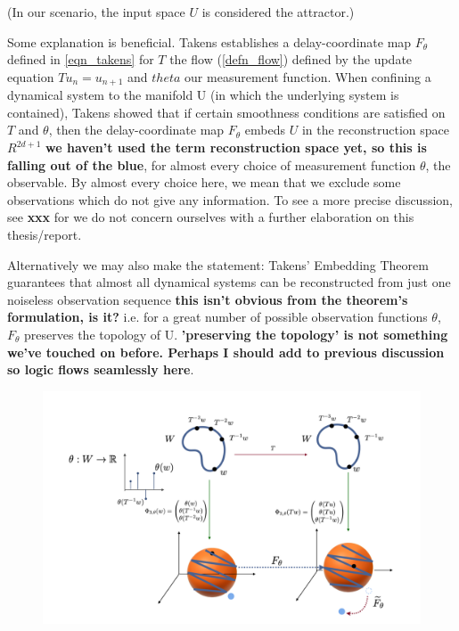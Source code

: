 \documentclass[12 pt]{article}
\newcommand{\Ftheta}{\ensuremath{F_\theta}}
\begin{document}
(In our scenario, the input space $U$ is considered the attractor.)

Some explanation is beneficial. Takens establishes a delay-coordinate map $\Ftheta$ defined in \ref{eqn_takens} for $T$ the flow (\ref{defn_flow}) defined by the update equation  $Tu_n=u_{n+1}$ and $theta$ our measurement function. When confining a dynamical system to the manifold U (in which the underlying system is contained), Takens showed that if certain smoothness conditions are satisfied on $T$ and $\theta$, then the delay-coordinate map $\Ftheta$ embeds $U$ in the reconstruction space $R^{2d+1}$ \textbf{we haven't used the term reconstruction space yet, so this is falling out of the blue}, for almost every choice of measurement function $\theta$, the observable. By almost every choice here, we mean that we exclude some observations which do not give any information. To see a more precise discussion, see \textbf{xxx} for we do not concern ourselves with a further elaboration on this thesis/report.

Alternatively we may also make the statement: Takens' Embedding Theorem guarantees that almost all dynamical systems can be reconstructed from just one noiseless observation sequence \textbf{this isn't obvious from the theorem's formulation, is it?} i.e. for a great number of possible observation functions $\theta$, $\Ftheta$ preserves the topology of U. \textbf{'preserving the topology' is not something we've touched on before. Perhaps I should add to previous discussion so logic flows seamlessly here}.

\begin{figure}[ht]
  \includegraphics[scale=0.3]{takensmap.png}
  \centering
  \label{fig:takensmap}
\end{figure}
\end{document}
